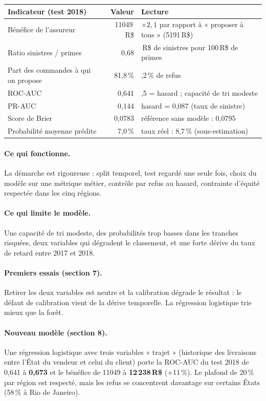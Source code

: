 \documentclass[11pt,a4paper]{article}
\newcommand{\RS}{\,R\$}
\begin{document}
\vspace{0.3cm}
\begin{center}
\begin{tabularx}{\linewidth}{@{}lr>{\raggedright\arraybackslash}X@{}}
\toprule
Indicateur (test 2018) & Valeur & Lecture \\
\midrule
Bénéfice de l'assureur & \num{11049}\RS{} & $\times 2{,}1$ par rapport à « proposer à tous » (\num{5191}\RS) \\
Ratio sinistres / primes & 0,68 & 68\RS{} de sinistres pour 100\RS{} de primes \\
Part des commandes à qui on propose & 81,8\,\% & 18,2\,\% de refus \\
ROC-AUC & 0,641 & 0,5 = hasard ; capacité de tri modeste \\
PR-AUC & 0,144 & hasard = 0,087 (taux de sinistre) \\
Score de Brier & 0,0783 & référence sans modèle : 0,0795 \\
Probabilité moyenne prédite & 7,0\,\% & taux réel : 8,7\,\% (sous-estimation) \\
\bottomrule
\end{tabularx}
\end{center}

\paragraph{Ce qui fonctionne.} La démarche est rigoureuse : split temporel, test regardé une
seule fois, choix du modèle sur une métrique métier, contrôle par refus au hasard, contrainte
d'équité respectée dans les cinq régions.

\paragraph{Ce qui limite le modèle.} Une capacité de tri modeste, des probabilités trop basses
dans les tranches risquées, deux variables qui dégradent le classement, et une forte dérive du
taux de retard entre 2017 et 2018.

\paragraph{Premiers essais (section 7).} Retirer les deux variables est neutre et la
calibration dégrade le résultat : le défaut de calibration vient de la dérive temporelle. La
régression logistique trie mieux que la forêt.

\paragraph{Nouveau modèle (section 8).} Une régression logistique avec trois variables
« trajet » (historique des livraisons entre l'État du vendeur et celui du client) porte la
ROC-AUC du test 2018 de 0,641 à \textbf{0,673} et le bénéfice de \num{11049} à
\textbf{12\,238\RS} (+11\,\%). Le plafond de 20\,\% par région est respecté, mais les refus
se concentrent davantage sur certains États (58\,\% à Rio de Janeiro).
\end{document}
